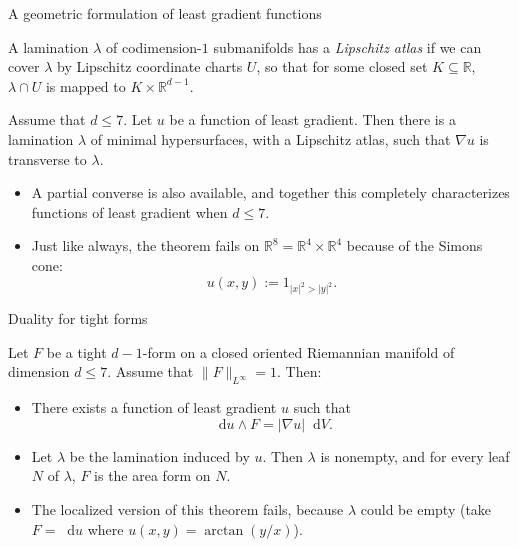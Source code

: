 \documentclass[10pt]{beamer}
\newcommand{\RR}{\mathbb{R}}
\newcommand*\dif{\mathop{}\!\mathrm{d}}
\begin{document}
\begin{frame}{A geometric formulation of least gradient functions}
\begin{definition}
A lamination $\lambda$ of codimension-$1$ submanifolds has a \emph{Lipschitz atlas} if we can cover $\lambda$ by Lipschitz coordinate charts $U$, so that for some closed set $K \subseteq \RR$, $\lambda \cap U$ is mapped to $K \times \RR^{d - 1}$. \pause
\end{definition}

\begin{theorem}[B '23]
Assume that $d \leq 7$.
Let $u$ be a function of least gradient.
Then there is a lamination $\lambda$ of minimal hypersurfaces, with a Lipschitz atlas, such that $\nabla u$ is transverse to $\lambda$. \pause
\end{theorem}

\begin{itemize}
\item A partial converse is also available, and together this completely characterizes functions of least gradient when $d \leq 7$. \pause
\item Just like always, the theorem fails on $\RR^8 = \RR^4 \times \RR^4$ because of the Simons cone:
$$u(x, y) := 1_{|x|^2 > |y|^2}.$$
\end{itemize}
    
\end{frame}

\begin{frame}{Duality for tight forms}

\begin{theorem}[B '24]
Let $F$ be a tight $d - 1$-form on a closed oriented Riemannian manifold of dimension $d \leq 7$.
Assume that $\|F\|_{L^\infty} = 1$.
Then: \pause
\begin{itemize}
\item There exists a function of least gradient $u$ such that
$$\dif u \wedge F = |\nabla u| \dif V.$$
\item Let $\lambda$ be the lamination induced by $u$. Then $\lambda$ is nonempty, and for every leaf $N$ of $\lambda$, $F$ is the area form on $N$. \pause
\end{itemize}
\end{theorem}

\begin{itemize}
\item The localized version of this theorem fails, because $\lambda$ could be empty (take $F = \dif u$ where $u(x, y) = \arctan(y/x)$).
\end{itemize}

\end{frame}
\end{document}
